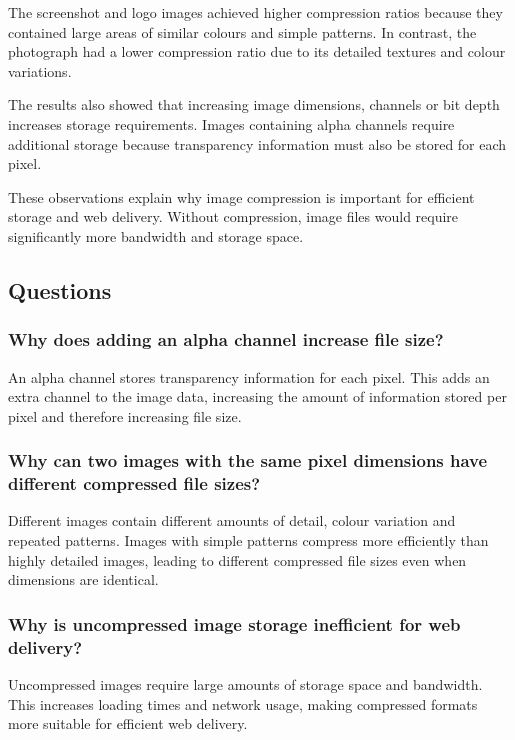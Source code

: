 \documentclass[12pt,a4paper]{article}
\begin{document}
The screenshot and logo images achieved higher compression ratios because they contained large areas of similar colours and simple patterns. In contrast, the photograph had a lower compression ratio due to its detailed textures and colour variations.

The results also showed that increasing image dimensions, channels or bit depth increases storage requirements. Images containing alpha channels require additional storage because transparency information must also be stored for each pixel.

These observations explain why image compression is important for efficient storage and web delivery. Without compression, image files would require significantly more bandwidth and storage space.

\subsection{Questions}

\subsubsection{Why does adding an alpha channel increase file size?}

An alpha channel stores transparency information for each pixel. This adds an extra channel to the image data, increasing the amount of information stored per pixel and therefore increasing file size.

\subsubsection{Why can two images with the same pixel dimensions have different compressed file sizes?}

Different images contain different amounts of detail, colour variation and repeated patterns. Images with simple patterns compress more efficiently than highly detailed images, leading to different compressed file sizes even when dimensions are identical.

\subsubsection{Why is uncompressed image storage inefficient for web delivery?}

Uncompressed images require large amounts of storage space and bandwidth. This increases loading times and network usage, making compressed formats more suitable for efficient web delivery.
\end{document}
